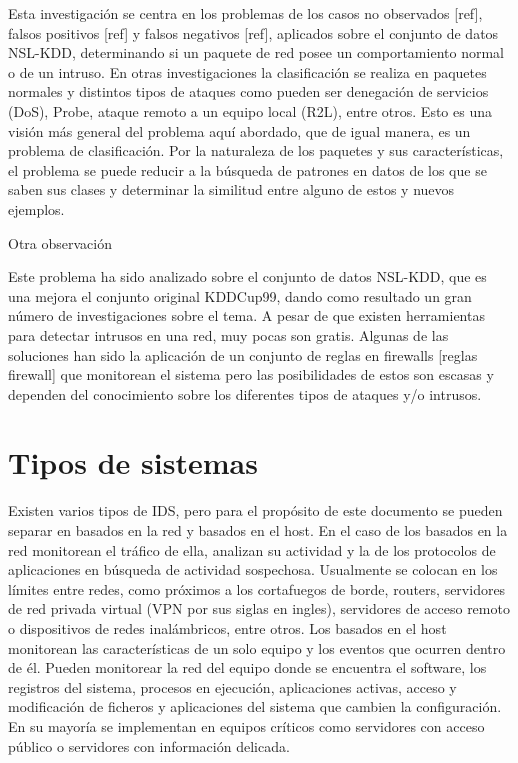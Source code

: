Esta investigación se centra en los problemas de los casos no observados [ref], falsos positivos [ref] y falsos negativos [ref], aplicados sobre el conjunto de datos NSL-KDD, determinando si un paquete de red posee un comportamiento normal o de un intruso. En otras investigaciones la clasificación se realiza en paquetes normales y distintos tipos de ataques como pueden ser denegación de servicios (DoS), Probe, ataque remoto a un equipo local (R2L), entre otros. Esto es una visión más general del problema aquí abordado, que de igual manera, es un problema de clasificación. Por la naturaleza de los paquetes y sus características, el problema se puede reducir a la búsqueda de patrones en datos de los que se saben sus clases y determinar la similitud entre alguno de estos y nuevos ejemplos.
    
Otra observación

Este problema ha sido analizado sobre el conjunto de datos NSL-KDD, que es una mejora el conjunto original KDDCup99, dando como resultado un gran número de investigaciones sobre el tema. A pesar de que existen herramientas para detectar intrusos en una red, muy pocas son gratis. Algunas de las soluciones han sido la aplicación de un conjunto de reglas en firewalls [reglas firewall] que monitorean el sistema pero las posibilidades de estos son escasas y dependen del conocimiento sobre los diferentes tipos de ataques y/o intrusos.

\section{Tipos de sistemas}
Existen varios tipos de IDS, pero para el propósito de este documento se pueden separar en basados en la red y basados en el host. En el caso de los basados en la red monitorean el tráfico de ella, analizan su actividad y la de los protocolos de aplicaciones en búsqueda de actividad sospechosa. Usualmente se colocan en los límites entre redes, como próximos a los cortafuegos de borde, routers, servidores de red privada virtual (VPN por sus siglas en ingles), servidores de acceso remoto o dispositivos de redes inalámbricos, entre otros. Los basados en el host monitorean las características de un solo equipo y los eventos que ocurren dentro de él. Pueden monitorear la red del equipo donde se encuentra el software, los registros del sistema, procesos en ejecución, aplicaciones activas, acceso y modificación de ficheros y aplicaciones del sistema que cambien la configuración. En su mayoría se implementan en equipos críticos como servidores con acceso público o servidores con información delicada.

